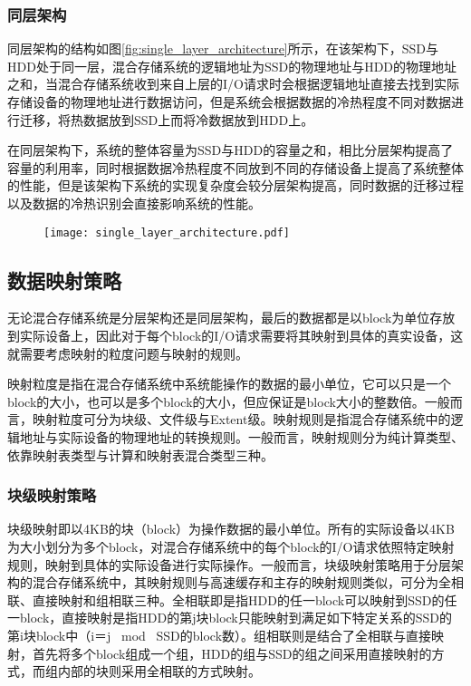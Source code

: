 \subsubsection{同层架构}

同层架构的结构如图\ref{fig:single_layer_architecture}所示，在该架构下，SSD与HDD处于同一层，混合存储系统的逻辑地址为SSD的物理地址与HDD的物理地址之和，当混合存储系统收到来自上层的I/O请求时会根据逻辑地址直接去找到实际存储设备的物理地址进行数据访问，但是系统会根据数据的冷热程度不同对数据进行迁移，将热数据放到SSD上而将冷数据放到HDD上。

在同层架构下，系统的整体容量为SSD与HDD的容量之和，相比分层架构提高了容量的利用率，同时根据数据冷热程度不同放到不同的存储设备上提高了系统整体的性能，但是该架构下系统的实现复杂度会较分层架构提高，同时数据的迁移过程以及数据的冷热识别会直接影响系统的性能。

\begin{figure}[!htp]
    \centering
    \texttt{[image: single\_layer\_architecture.pdf]}
\end{figure}

\subsection{数据映射策略}

无论混合存储系统是分层架构还是同层架构，最后的数据都是以block为单位存放到实际设备上，因此对于每个block的I/O请求需要将其映射到具体的真实设备，这就需要考虑映射的粒度问题与映射的规则。

映射粒度是指在混合存储系统中系统能操作的数据的最小单位，它可以只是一个block的大小，也可以是多个block的大小，但应保证是block大小的整数倍。一般而言，映射粒度可分为块级、文件级与Extent级。映射规则是指混合存储系统中的逻辑地址与实际设备的物理地址的转换规则。一般而言，映射规则分为纯计算类型、依靠映射表类型与计算和映射表混合类型三种。

\subsubsection{块级映射策略}

块级映射即以4KB的块（block）为操作数据的最小单位。所有的实际设备以4KB为大小划分为多个block，对混合存储系统中的每个block的I/O请求依照特定映射规则，映射到具体的实际设备进行实际操作。一般而言，块级映射策略用于分层架构的混合存储系统中，其映射规则与高速缓存和主存的映射规则类似，可分为全相联、直接映射和组相联三种。全相联即是指HDD的任一block可以映射到SSD的任一block，直接映射是指HDD的第j块block只能映射到满足如下特定关系的SSD的第i块block中（i＝j \  mod \  SSD的block数）。组相联则是结合了全相联与直接映射，首先将多个block组成一个组，HDD的组与SSD的组之间采用直接映射的方式，而组内部的块则采用全相联的方式映射。

